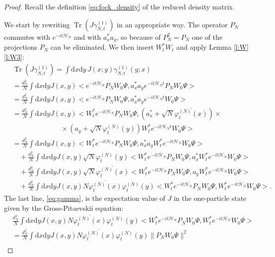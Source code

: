 \documentclass[11pt,a4paper,draft,DIV11]{scrartcl}	%
\newcommand{\di}{\textrm{d}}		%
\newcommand{\Hcal}{\mathcal{H}}		%
\newcommand{\scal}[2]{\big<#1,#2\big>} %
\newcommand{\cc}[1]{\overline{#1}}	%
\newcommand{\norm}[1]{\lVert#1\rVert}	%
\newcommand{\ph}{\varphi_t^{(N)}}	%
\newcommand{\Tr}{\operatorname{Tr}}	%
\newcommand{\eqr}[1]{\eqref{eq:#1}}			%
\begin{document}
\begin{proof}
Recall the definition \eqr{fock_density} of the reduced density matrix. 

We start by rewriting $\Tr\left(J \gamma_{N,t}^{(1)} \right)$ in an appropriate way. The operator $P_N$ commutes with $e^{-it \Hcal_N}$ and with $a^\ast_x a_y$, so because of $P_N^2 = P_N$ one of the projections $P_N$ can be eliminated. We then insert $W^\ast_t W_t$ and apply Lemma \ref{l:W} \ref{l:W3}:
\begin{align}
& \Tr\left(J\gamma_{N,t}^{(1)}\right) = \int \di x \di y\, J(x;y) \gamma_{N,t}^{(1)}(y;x) \nonumber\\
& = \frac{d_N^2}{N} \int \di x\di y J(x,y) \scal{e^{-it\Hcal_N}P_N W_0 \Psi}{ a^\ast_x a_y e^{-it\Hcal_N t}P_N W_0 \Psi} \nonumber\\
& = \frac{d_N^2}{N} \int \di x\di y J(x,y) \scal{e^{-it\Hcal_N}P_N W_0 \Psi}{ a^\ast_x a_y e^{-it\Hcal_N t}W_0 \Psi} \nonumber\\
& = \frac{d_N^2}{N} \int \di x\di y J(x,y) \scal{W^\ast_t e^{-it\Hcal_N}P_N W_0 \Psi}{\left(a^\ast_x + \sqrt{N} \cc{\ph(x)} \right) \times \nonumber\\
& \qquad\qquad\qquad\quad \times \left(a_y + \sqrt{N} \ph(y) \right) W^\ast_t e^{-it\Hcal_N t}W_0 \Psi} \nonumber\\
& = \frac{d_N^2}{N} \int \di x\di y J(x,y) \scal{W^\ast_t e^{-it\Hcal_N}P_N W_0 \Psi}{a^\ast_x a_y W^\ast_t e^{-it \Hcal_N} W_0 \Psi} \label{eq:quad}\\
& \quad + \frac{d_N^2}{N} \int \di x\di y J(x,y) \sqrt{N} \ph(y) \scal{W^\ast_t e^{-it\Hcal_N} P_N W_0 \Psi}{a^\ast_x W^\ast_t e^{-it \Hcal_N} W_0 \Psi} \label{eq:lin1} \\
& \quad + \frac{d_N^2}{N} \int \di x\di y J(x,y) \sqrt{N} \cc{\ph(x)} \scal{W^\ast_t e^{-it\Hcal_N}P_N W_0 \Psi}{a_y W^\ast_t e^{-it\Hcal_N} W_0 \Psi} \label{eq:lin2} \\
& \quad + \frac{d_N^2}{N} \int \di x\di y J(x,y) N \cc{\ph(x)}\ph(y) \scal{W^\ast_t e^{-it\Hcal_N} P_N W_0 \Psi}{W^\ast_t e^{-it\Hcal_N} W_0 \Psi}. \label{eq:gamma}
\end{align}
The last line, \eqref{eq:gamma}, is the expectation value of $J$ in the one-particle state given by the Gross-Pitaevskii equation:
\begin{align*}
& \frac{d_N^2}{N} \int \di x\di y J(x,y) N \cc{\ph(x)}\ph(y) \scal{W^\ast_t e^{-it\Hcal_N} P_N W_0 \Psi}{W^\ast_t e^{-it\Hcal_N} W_0 \Psi} \\
& = \frac{d_N^2}{N} \int \di x\di y J(x,y) N \cc{\ph(x)}\ph(y) \norm{P_N W_0 \Psi}^2 \\

\end{align*}
\end{proof}
\end{document}
